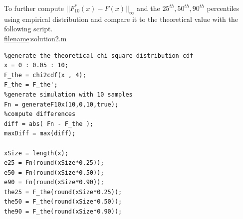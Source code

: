 \documentclass[twoside]{article}
\begin{document}
To further compute $||F_{10}^*(x)-F(x)||_\infty$ and the $25^{th},50^{th},90^{th}$ percentiles using empirical distribution and compare it to the theoretical value with the following script.\\
\underline{filename}:solution2.m\\
\begin{lstlisting}
%generate the theoretical chi-square distribution cdf
x = 0 : 0.05 : 10;
F_the = chi2cdf(x , 4);
F_the = F_the';
%generate simulation with 10 samples
Fn = generateF10x(10,0,10,true);
%compute differences
diff = abs( Fn - F_the );
maxDiff = max(diff);

xSize = length(x);
e25 = Fn(round(xSize*0.25));
e50 = Fn(round(xSize*0.50));
e90 = Fn(round(xSize*0.90));
the25 = F_the(round(xSize*0.25));
the50 = F_the(round(xSize*0.50));
the90 = F_the(round(xSize*0.90));
\end{lstlisting}
\end{document}
